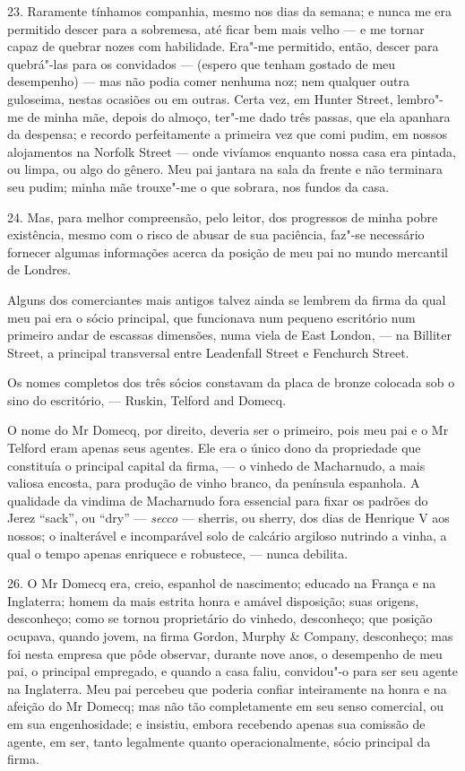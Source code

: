 23. Raramente tínhamos companhia, mesmo nos dias da semana; e nunca me
era permitido descer para a sobremesa, até ficar bem mais velho --- e me
tornar capaz de quebrar nozes com habilidade. Era"-me permitido, então,
descer para quebrá"-las para os convidados --- (espero que tenham gostado
de meu desempenho) --- mas não podia comer nenhuma noz; nem qualquer
outra guloseima, nestas ocasiões ou em outras. Certa vez, em Hunter
Street, lembro"-me de minha mãe, depois do almoço, ter"-me dado três
passas, que ela apanhara da despensa; e recordo perfeitamente a primeira
vez que comi pudim, em nossos alojamentos na Norfolk Street --- onde
vivíamos enquanto nossa casa era pintada, ou limpa, ou algo do gênero.
Meu pai jantara na sala da frente e não terminara seu pudim; minha mãe
trouxe"-me o que sobrara, nos fundos da casa.

24. Mas, para melhor compreensão, pelo leitor, dos progressos de minha
pobre existência, mesmo com o risco de abusar de sua paciência, faz"-se
necessário fornecer algumas informações acerca da posição de meu pai no
mundo mercantil de Londres.

Alguns dos comerciantes mais antigos talvez ainda se lembrem da firma da
qual meu pai era o sócio principal, que funcionava num pequeno
escritório num primeiro andar de escassas dimensões, numa viela de East
London, --- na Billiter Street, a principal transversal entre Leadenfall
Street e Fenchurch Street.

Os nomes completos dos três sócios constavam da placa de bronze colocada
sob o sino do escritório, --- Ruskin, Telford and Domecq.

O nome do Mr Domecq, por direito, deveria ser o primeiro, pois meu pai e
o Mr Telford eram apenas seus agentes. Ele era o único dono da
propriedade que constituía o principal capital da firma, --- o vinhedo de
Macharnudo, a mais valiosa encosta, para produção de vinho branco, da
península espanhola. A qualidade da vindima de Macharnudo fora essencial
para fixar os padrões do Jerez ``sack'', ou ``dry'' --- \emph{secco} ---
sherris, ou sherry, dos dias de Henrique V aos nossos; o inalterável e
incomparável solo de calcário argiloso nutrindo a vinha, a qual o tempo
apenas enriquece e robustece, --- nunca debilita.

26. O Mr Domecq era, creio, espanhol de nascimento; educado na França e
na Inglaterra; homem da mais estrita honra e amável disposição; suas
origens, desconheço; como se tornou proprietário do vinhedo, desconheço;
que posição ocupava, quando jovem, na firma Gordon, Murphy \& Company,
desconheço; mas foi nesta empresa que pôde observar, durante nove anos,
o desempenho de meu pai, o principal empregado, e quando a casa faliu,
convidou"-o para ser seu agente na Inglaterra. Meu pai percebeu que
poderia confiar inteiramente na honra e na afeição do Mr Domecq; mas não
tão completamente em seu senso comercial, ou em sua engenhosidade; e
insistiu, embora recebendo apenas sua comissão de agente, em ser, tanto
legalmente quanto operacionalmente, sócio principal da firma.

